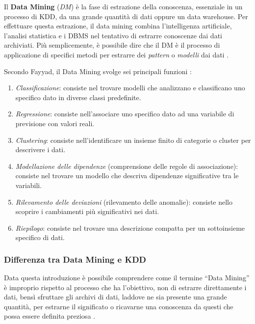 Il \textbf{Data Mining} (\textit{DM}) è la fase di estrazione della conoscenza, essenziale in un processo di KDD, da una grande quantità di dati oppure un data warehouse. Per effettuare questa estrazione, il data mining combina l'intelligenza artificiale, l'analisi statistica e i DBMS nel tentativo di estrarre conoscenze dai dati archiviati. Più semplicemente, è possibile dire che il DM è il processo di applicazione di specifici metodi per estrarre dei \textit{pattern} o \textit{modelli} dai dati \cite{citeseerx_data_mining}.

Secondo Fayyad, il Data Mining svolge sei principali funzioni \cite{aircconline_data_mining}:

\begin{enumerate}
    \item \textit{Classificazione}: consiste nel trovare modelli che analizzano e classificano uno specifico dato in diverse classi predefinite.
    \item \textit{Regressione}: consiste nell'associare uno specifico dato ad una variabile di previsione con valori reali.
    \item \textit{Clustering}: consiste nell'identificare un insieme finito di categorie o cluster per descrivere i dati.
    \item \textit{Modellazione delle dipendenze} (comprensione delle regole di associazione): consiste nel trovare un modello che descriva dipendenze significative tra le variabili.
    \item \textit{Rilevamento delle deviazioni} (rilevamento delle anomalie): consiste nello scoprire i cambiamenti più significativi nei dati.
    \item \textit{Riepilogo}: consiste nel trovare una descrizione compatta per un sottoinsieme specifico di dati.
\end{enumerate}

\subsubsection{Differenza tra Data Mining e KDD}

Data questa introduzione è possibile comprendere come il termine “Data Mining” è improprio rispetto al processo che ha l'obiettivo, non di estrarre direttamente i dati, bensì sfruttare gli archivi di dati, laddove ne sia presente una grande quantità, per estrarne il significato o ricavarne una conoscenza da questi che possa essere definita preziosa \cite{aws_data_mining}.

